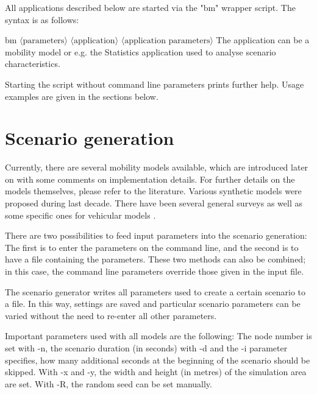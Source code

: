 \documentclass[11pt,a4paper,twoside,normalheadings,headsepline,DIV13,BCOR11mm,openright]{article}
\begin{document}
All  applications  described  below  are  started  via  the "bm" wrapper
script. The syntax is as follows:
\newline

   bm $\langle \textrm{parameters} \rangle$ $\langle \textrm{application}
   \rangle$ $\langle \textrm{application parameters}\rangle$
\newline \newline
The  application  can  be  a  mobility  model  or  e.g.  the  Statistics
application used to analyse scenario characteristics.

Starting the script without command line parameters prints further help.
Usage examples are given in the sections below.


\section{Scenario generation}

Currently, there are several mobility models available, which are
introduced later on with some comments on implementation details. For
further details on the models themselves, please refer to the
literature. Various synthetic models were proposed during last
decade. There have been several general surveys
\cite{camp_classification_2002,bettstetter_classification_2001,bai_helmy_adhocsensor_ch1,musolesi-mascolo_survey_2008}
as well as some specific ones for vehicular models
\cite{hoogendoorn-survey_vehicular_2001}.

There are two possibilities to feed input parameters into  the  scenario
generation:  The  first  is to enter the parameters on the command line,
and the second is to have a file containing the  parameters.  These  two
methods  can also be combined; in this case, the command line parameters
override those given in the input file.

The scenario generator writes all parameters used to  create  a  certain
scenario  to  a  file.  In  this  way, settings are saved and particular
scenario parameters can be varied without the need to re-enter all other
parameters.

Important  parameters  used  with all models are the following: The node
number is set with -n, the scenario duration (in seconds)  with  -d  and
the -i parameter specifies, how many additional seconds at the beginning
of the scenario should be skipped. With -x and -y, the width and  height
(in metres) of the simulation area are set. With -R, the random seed can
be set manually.
\end{document}
